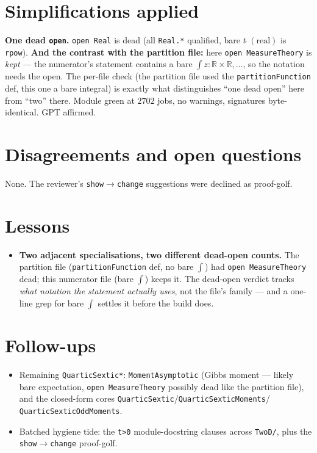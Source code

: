 \documentclass[11pt]{article}
\begin{document}
\section{Simplifications applied}
\textbf{One dead \texttt{open}.} \texttt{open Real} is dead (all \texttt{Real.*} qualified, bare
$t\,\hat{}\,(\text{real})$ is \texttt{rpow}). \textbf{And the contrast with the partition file:}
here \texttt{open MeasureTheory} is \emph{kept} --- the numerator's statement contains a bare
$\int z:\mathbb R\times\mathbb R,\dots$, so the notation needs the open. The per-file check (the
partition file used the \texttt{partitionFunction} def, this one a bare integral) is exactly what
distinguishes ``one dead open'' here from ``two'' there. Module green at $2702$ jobs, no warnings,
signatures byte-identical. GPT affirmed.

\section{Disagreements and open questions}
None. The reviewer's \texttt{show}$\to$\texttt{change} suggestions were declined as proof-golf.

\section{Lessons}
\begin{itemize}[noitemsep]
  \item \textbf{Two adjacent specialisations, two different dead-open counts.} The partition file
    (\texttt{partitionFunction} def, no bare $\int$) had \texttt{open MeasureTheory} dead; this
    numerator file (bare $\int$) keeps it. The dead-open verdict tracks \emph{what notation the
    statement actually uses}, not the file's family --- and a one-line grep for bare $\int$ settles
    it before the build does.
\end{itemize}

\section{Follow-ups}
\begin{itemize}[noitemsep]
  \item Remaining \texttt{QuarticSextic*}: \texttt{MomentAsymptotic} (Gibbs moment --- likely bare
    expectation, \texttt{open MeasureTheory} possibly dead like the partition file), and the
    closed-form cores \texttt{QuarticSextic}/\texttt{QuarticSexticMoments}/%
    \texttt{QuarticSexticOddMoments}.
  \item Batched hygiene tide: the \texttt{t>0} module-docstring clauses across \texttt{TwoD/}, plus
    the \texttt{show}$\to$\texttt{change} proof-golf.
\end{itemize}
\end{document}
